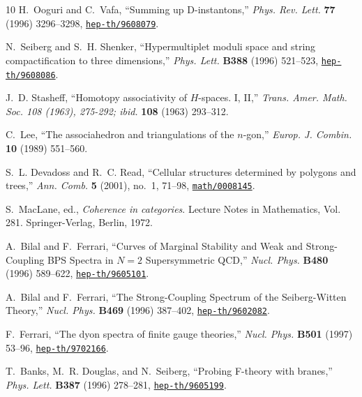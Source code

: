 \begin{thebibliography}{10}
H.~Ooguri and C.~Vafa, ``{S}umming up {D}-instantons,'' {\em Phys. Rev. Lett.}
  {\bf 77} (1996) 3296--3298,
\href{http://www.arXiv.org/abs/hep-th/9608079}{{\tt hep-th/9608079}}.

N.~Seiberg and S.~H. Shenker, ``Hypermultiplet moduli space and string
  compactification to three dimensions,'' {\em Phys. Lett.} {\bf B388} (1996)
  521--523,
\href{http://www.arXiv.org/abs/hep-th/9608086}{{\tt hep-th/9608086}}.

J.~D. Stasheff, ``Homotopy associativity of {$H$}-spaces. {I}, {II},'' {\em
  Trans. Amer. Math. Soc. 108 (1963), 275-292; ibid.} {\bf 108} (1963)
  293--312.

C.~Lee, ``The associahedron and triangulations of the {$n$}-gon,'' {\em Europ.
  J. Combin.} {\bf 10} (1989) 551--560.

S.~L. Devadoss and R.~C. Read, ``Cellular structures determined by polygons and
  trees,'' {\em Ann. Comb.} {\bf 5} (2001), no.~1, 71--98,
  \href{http://www.arXiv.org/abs/math/0008145}{{\tt math/0008145}}.

S.~MacLane, ed., {\em Coherence in categories}.
\newblock Lecture Notes in Mathematics, Vol. 281. Springer-Verlag, Berlin,
  1972.

A.~Bilal and F.~Ferrari, ``{Curves of Marginal Stability and Weak and
  Strong-Coupling BPS Spectra in {$N=2$} Supersymmetric {QCD}},'' {\em Nucl.
  Phys.} {\bf B480} (1996) 589--622,
\href{http://www.arXiv.org/abs/hep-th/9605101}{{\tt hep-th/9605101}}.

A.~Bilal and F.~Ferrari, ``{The Strong-Coupling Spectrum of the Seiberg-Witten
  Theory},'' {\em Nucl. Phys.} {\bf B469} (1996) 387--402,
\href{http://www.arXiv.org/abs/hep-th/9602082}{{\tt hep-th/9602082}}.

F.~Ferrari, ``{The dyon spectra of finite gauge theories},'' {\em Nucl. Phys.}
  {\bf B501} (1997) 53--96,
\href{http://www.arXiv.org/abs/hep-th/9702166}{{\tt hep-th/9702166}}.

T.~Banks, M.~R. Douglas, and N.~Seiberg, ``{Probing F-theory with branes},''
  {\em Phys. Lett.} {\bf B387} (1996) 278--281,
\href{http://www.arXiv.org/abs/hep-th/9605199}{{\tt hep-th/9605199}}.


\end{thebibliography}
